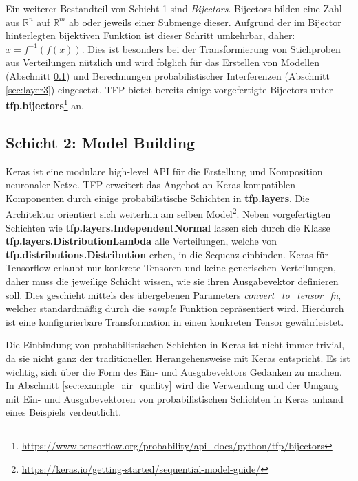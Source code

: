 \documentclass[12pt]{article}
\begin{document}
Ein weiterer Bestandteil von Schicht 1 sind \textit{Bijectors}. Bijectors bilden eine Zahl aus $\mathbb{R}^n$ auf $\mathbb{R}^m$ ab oder jeweils einer Submenge dieser. Aufgrund der im Bijector hinterlegten bijektiven Funktion ist dieser Schritt umkehrbar, daher: $x = f^{-1}(f(x))$. Dies ist besonders bei der Transformierung von Stichproben aus Verteilungen nützlich und wird folglich für das Erstellen von Modellen (Abschnitt \ref{sec:layer2}) und Berechnungen probabilistischer Interferenzen (Abschnitt \ref{sec:layer3}) eingesetzt. TFP bietet bereits einige vorgefertigte Bijectors unter \textbf{tfp.bijectors}\footnote{\url{https://www.tensorflow.org/probability/api_docs/python/tfp/bijectors}} an. 


\subsection{Schicht 2: Model Building}
\label{sec:layer2}

Keras ist eine modulare high-level API für die Erstellung und Komposition neuronaler Netze. TFP erweitert das Angebot an Keras-kompatiblen Komponenten durch einige probabilistische Schichten in \textbf{tfp.layers}. Die Architektur orientiert sich weiterhin am selben Model\footnote{\url{https://keras.io/getting-started/sequential-model-guide/}}. Neben vorgefertigten Schichten wie \textbf{tfp.layers.IndependentNormal} lassen sich durch die Klasse \textbf{tfp.layers.DistributionLambda} alle Verteilungen, welche von \textbf{tfp.distributions.Distribution} erben, in die Sequenz einbinden. Keras für Tensorflow erlaubt nur konkrete Tensoren und keine generischen Verteilungen, daher muss   die jeweilige Schicht wissen, wie sie ihren Ausgabevektor definieren soll. Dies geschieht mittels des übergebenen Parameters \textit{convert\_to\_tensor\_fn}, welcher standardmäßig durch die \textit{sample} Funktion repräsentiert wird. Hierdurch ist eine konfigurierbare Transformation in einen konkreten Tensor gewährleistet.

Die Einbindung von probabilistischen Schichten in Keras ist nicht immer trivial, da sie nicht ganz der traditionellen Herangehensweise mit Keras entspricht. Es ist wichtig, sich über die Form des Ein- und Ausgabevektors Gedanken zu machen. In Abschnitt \ref{sec:example_air_quality} wird die Verwendung und der Umgang mit Ein- und Ausgabevektoren von probabilistischen Schichten in Keras anhand eines Beispiels verdeutlicht.

\end{document}
